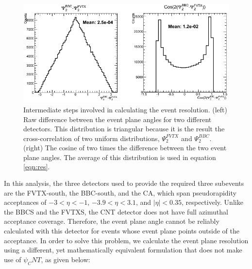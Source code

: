 \begin{figure}[!h]
\begin{center}
\includegraphics[width=0.75\linewidth]{figs/resolution_intermediate_calc.png}
\caption{Intermediate steps involved in calculating the event resolution. (left) Raw difference between the event plane angles for two different detectors. This distribution is triangular because it is the result the cross-correlation of two uniform distributions, $\Psi_2^{FVTX}$ and $\Psi_2^{BBC}$. (right) The cosine of two times the difference between the two event plane angles. The average of this distribution is used in equation \ref{eqn:res}.}
\label{fig:fvtx_ew_default}
\end{center}
\end{figure}

In this analysis, the three detectors used to provide the required three subevents are the FVTX-south, the BBC-south, and the CA, which span pseudorapidity acceptances of $-3 <\eta < -1$, $-3.9 < \eta < 3.1$, and $|\eta| < 0.35$, respectively. 
Unlike the BBCS and the FVTXS, the CNT detector does not have full azimuthal acceptance coverage. Therefore, the event plane angle cannot be reliably calculated with this detector for events whose event plane points outside of the acceptance. In order to solve this problem, we calculate the event plane resolution using a different, yet mathematically equivalent formulation that does not make use of $\psi_CNT$, as given below:

